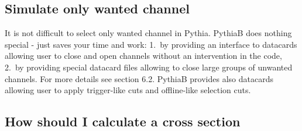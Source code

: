 \subsection{Simulate only wanted channel}
It is not difficult to select only wanted channel in Pythia.
PythiaB does nothing special - just saves your time and work:
1.~by providing an interface to datacards allowing user to close
and open channels without an intervention in the code, 2.~by
providing special datacard files allowing to close large groups of
unwanted channels. For more details see section 6.2. PythiaB
provides also datacards allowing user  to apply trigger-like cuts
and offline-like selection cuts.

\subsection{How should I calculate a cross section}

